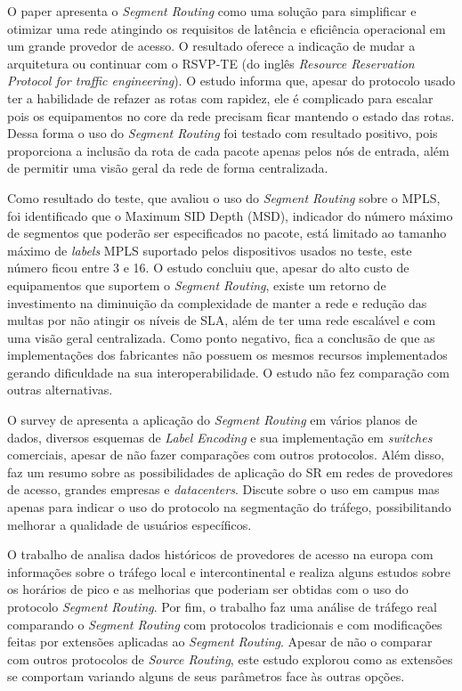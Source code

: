 \documentclass[12pt]{article}
\begin{document}
O paper \cite{elaineyeo2019} apresenta o \textit{Segment Routing} como uma solução para simplificar e otimizar uma rede atingindo os requisitos de latência e eficiência operacional em um grande provedor de acesso. O resultado oferece a indicação de mudar a arquitetura ou continuar com o RSVP-TE (do inglês \textit{Resource Reservation Protocol for traffic engineering}). O estudo informa que, apesar do protocolo usado ter a habilidade de refazer as rotas com rapidez, ele é complicado para escalar pois os equipamentos no core da rede precisam ficar mantendo o estado das rotas. Dessa forma o uso do \textit{Segment Routing} foi testado com resultado positivo, pois proporciona a inclusão da rota de cada pacote apenas pelos nós de entrada, além de permitir uma visão geral da rede de forma centralizada.

Como resultado do teste, que avaliou o uso do \textit{Segment Routing} sobre o MPLS, foi identificado que o Maximum SID Depth (MSD), indicador do número máximo de segmentos que poderão ser especificados no pacote, está limitado ao tamanho máximo de \textit{labels} MPLS suportado pelos dispositivos usados no teste, este número ficou entre 3 e 16. O estudo concluiu que, apesar do alto custo de equipamentos que suportem o \textit{Segment Routing}, existe um retorno de investimento na diminuição da complexidade de manter a rede e redução das multas por não atingir os níveis de SLA, além de ter uma rede escalável e com uma visão geral centralizada. Como ponto negativo, fica a conclusão de que as implementações dos fabricantes não possuem os mesmos recursos implementados gerando dificuldade na sua interoperabilidade. O estudo não fez comparação com outras alternativas.

O survey de \cite{kushwaha2020survey} apresenta a aplicação do \textit{Segment Routing} em vários planos de dados, diversos esquemas de \textit{Label Encoding} e sua implementação em \textit{switches} comerciais, apesar de não fazer comparações com outros protocolos. Além disso, faz um resumo sobre as possibilidades de aplicação do SR em redes de provedores de acesso, grandes empresas e \textit{datacenters}. Discute sobre o uso em campus mas apenas para indicar o uso do protocolo na segmentação do tráfego, possibilitando melhorar a qualidade de usuários específicos.

O trabalho de \cite{schuller2018traffic} analisa dados históricos de provedores de acesso na europa com informações sobre o tráfego local e intercontinental e realiza alguns estudos sobre os horários de pico e as melhorias que poderiam ser obtidas com o uso do protocolo \textit{Segment Routing}. Por fim, o trabalho faz uma análise de tráfego real comparando o \textit{Segment Routing} com protocolos tradicionais e com modificações feitas por extensões aplicadas ao \textit{Segment Routing}. Apesar de não o comparar com outros protocolos de \textit{Source Routing}, este estudo explorou como as extensões se comportam variando alguns de seus parâmetros face às outras opções.
\end{document}
